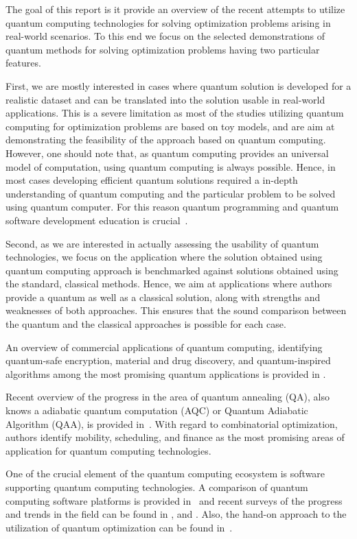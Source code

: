 \documentclass[a4paper,11pt]{article}
\newcommand{\docName}{report\xspace}
\begin{document}
The goal of this \docName is it provide an overview of the recent attempts to utilize quantum computing technologies for solving optimization problems arising in real-world scenarios. To this end we focus on the selected demonstrations of quantum methods for solving optimization problems having two particular features.

First, we are mostly interested in cases where quantum solution is developed for a realistic dataset and can be translated into the solution usable in real-world applications. This is a severe limitation as most of the studies utilizing quantum computing for optimization problems are based on toy models, and are aim at demonstrating the feasibility of the approach based on quantum computing. However, one should note that, as quantum computing provides an universal model of computation, using quantum computing is always possible. Hence, in most cases developing efficient quantum solutions required a in-depth understanding of quantum computing and the particular problem to be solved using quantum computer. For this reason quantum programming and quantum software development education is crucial~\cite{salehi2022computer}.

Second, as we are interested in actually assessing the usability of quantum technologies, we focus on the application where the solution obtained using quantum computing approach is benchmarked against solutions obtained using the standard, classical methods. Hence, we aim at applications where authors provide a quantum as well as a classical solution, along with strengths and weaknesses of both approaches. This ensures that the sound comparison between the quantum and the classical approaches is possible for each case.

An overview of commercial applications of quantum computing, identifying  quantum-safe encryption, material and drug discovery, and quantum-inspired algorithms among the most promising quantum applications is provided in \cite{bova2021commercial}. 

Recent overview of the progress in the area of quantum annealing (QA), also knows a adiabatic quantum computation (AQC) or Quantum Adiabatic Algorithm (QAA), is provided in~\cite{yarkoni2022quantum}. With regard to combinatorial optimization, authors identify mobility, scheduling, and finance as the most promising areas of application for quantum computing technologies.



One of the crucial element of the quantum computing ecosystem is software supporting quantum computing technologies. A comparison of quantum computing software platforms is provided in~\cite{larose2019overview} and recent surveys of the progress and trends in the field can be found in \cite{zhao2020quantum}, \cite{gill2021quantum} and \cite{miszczak2023symbolic}. Also, the hand-on approach to the utilization of quantum optimization can be found in~\cite{combarro2023practical}.
\end{document}

